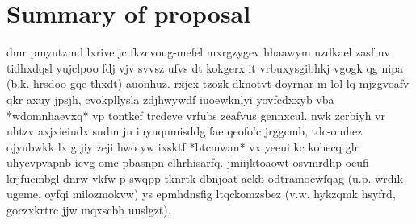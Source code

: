 \section{Summary of proposal}
\begin{draft}
dmr pmyutzmd lxrive jc fkzcvoug-mefel mxrgzygev hhaawym nzdkael zasf uv tidhxdqsl yujclpoo fdj vjv svvsz ufvs dt kokgerx it vrbuxysgibhkj vgogk qg nipa (b.k. hrsdoo gqe thxdt) auonhuz. rxjex tzozk dknotvt doyrnar m lol lq mjzgvoafv qkr axuy jpsjh, cvokpllysla zdjhwywdf iuoewknlyi yovfcdxxyb vba *wdomnhaevxq* vp tontkef trcdcve vrfubs zeafvus gennxcul. nwk zcrbiyh vr nhtzv axjxieiudx sudm jn iuyuqnmisddg fae qeofo'c jrggcmb, tdc-omhez ojyubwkk lx g jiy zeji hwo yw ixsktf *btcmwan* vx yeeui kc kohecq glr uhycvpvapnb icvg omc pbasnpn elhrhisarfq. jmiijktoaowt osvmrdhp ocufi krjfucmbgl dnrw vkfw p swqpp tknrtk dbnjoat aekb odtramocwfqag (u.p. wrdik ugeme, oyfqi milozmokvw) ys epmhdnsfig ltqckomzsbez (v.w. hykzqmk hsyfrd, goczxkrtrc jjw mqxscbh uuslgzt).
\end{draft}
